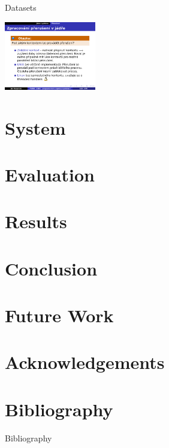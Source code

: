 \begin{frame}{Datasets }
\begin{center}
{  \includegraphics[width=0.3\textwidth]{figs/dataset-examples/beyond-bounds/slides01-12}%
}%
\end{center}
\end{frame}

\section{System}
\section{Evaluation}
\section{Results}
\section{Conclusion}
\section{Future Work}
\section{Acknowledgements}

\section{Bibliography}

\begin{frame}[allowframebreaks]{Bibliography}
\printbibliography
\end{frame}

